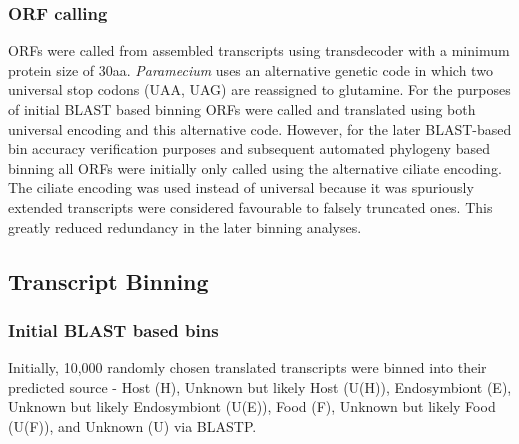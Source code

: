 \subsubsection{ORF calling}

ORFs were called from assembled transcripts using transdecoder \citep{Haas2013} with 
a minimum protein size of 30aa.  \textit{Paramecium} uses an alternative
genetic code in which two universal stop codons (UAA, UAG) are reassigned to glutamine.
For the purposes of initial BLAST based binning ORFs were called and translated
using both universal encoding and this alternative code. However, for 
the later BLAST-based bin accuracy verification purposes and subsequent
automated phylogeny based binning all ORFs were initially only called using 
the alternative ciliate encoding. The ciliate encoding was used
instead of universal because it was spuriously extended transcripts
were considered favourable to falsely truncated ones.
This greatly reduced redundancy in the later binning analyses.

\subsection{Transcript Binning}

\subsubsection{Initial BLAST based bins}

Initially, 10,000 randomly chosen translated transcripts were binned into their predicted source - 
Host (H), Unknown but likely Host (U(H)), Endosymbiont (E), Unknown but likely Endosymbiont (U(E)), Food (F), Unknown but likely Food (U(F)), and
Unknown (U) via BLASTP. 

